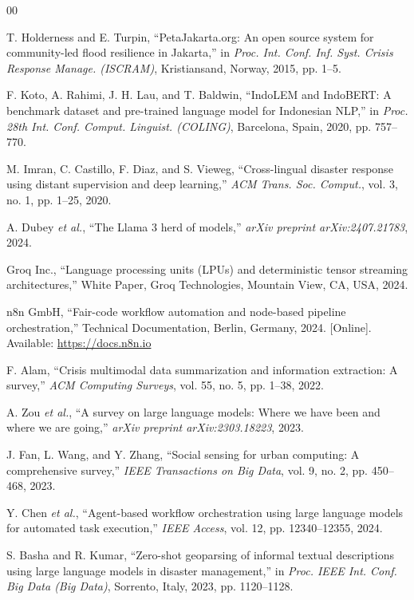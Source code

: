 \documentclass[conference]{IEEEtran}
\begin{document}
\begin{thebibliography}{00}

T. Holderness and E. Turpin, ``PetaJakarta.org: An open source system for community-led flood resilience in Jakarta,'' in \emph{Proc. Int. Conf. Inf. Syst. Crisis Response Manage. (ISCRAM)}, Kristiansand, Norway, 2015, pp. 1--5.

F. Koto, A. Rahimi, J. H. Lau, and T. Baldwin, ``IndoLEM and IndoBERT: A benchmark dataset and pre-trained language model for Indonesian NLP,'' in \emph{Proc. 28th Int. Conf. Comput. Linguist. (COLING)}, Barcelona, Spain, 2020, pp. 757--770.

M. Imran, C. Castillo, F. Diaz, and S. Vieweg, ``Cross-lingual disaster response using distant supervision and deep learning,'' \emph{ACM Trans. Soc. Comput.}, vol. 3, no. 1, pp. 1--25, 2020.

A. Dubey \emph{et al.}, ``The Llama 3 herd of models,'' \emph{arXiv preprint arXiv:2407.21783}, 2024.

Groq Inc., ``Language processing units (LPUs) and deterministic tensor streaming architectures,'' White Paper, Groq Technologies, Mountain View, CA, USA, 2024.

n8n GmbH, ``Fair-code workflow automation and node-based pipeline orchestration,'' Technical Documentation, Berlin, Germany, 2024. [Online]. Available: \url{https://docs.n8n.io}

F. Alam, ``Crisis multimodal data summarization and information extraction: A survey,'' \emph{ACM Computing Surveys}, vol. 55, no. 5, pp. 1--38, 2022.

A. Zou \emph{et al.}, ``A survey on large language models: Where we have been and where we are going,'' \emph{arXiv preprint arXiv:2303.18223}, 2023.

J. Fan, L. Wang, and Y. Zhang, ``Social sensing for urban computing: A comprehensive survey,'' \emph{IEEE Transactions on Big Data}, vol. 9, no. 2, pp. 450--468, 2023.

Y. Chen \emph{et al.}, ``Agent-based workflow orchestration using large language models for automated task execution,'' \emph{IEEE Access}, vol. 12, pp. 12340--12355, 2024.

S. Basha and R. Kumar, ``Zero-shot geoparsing of informal textual descriptions using large language models in disaster management,'' in \emph{Proc. IEEE Int. Conf. Big Data (Big Data)}, Sorrento, Italy, 2023, pp. 1120--1128.


\end{thebibliography}
\end{document}
